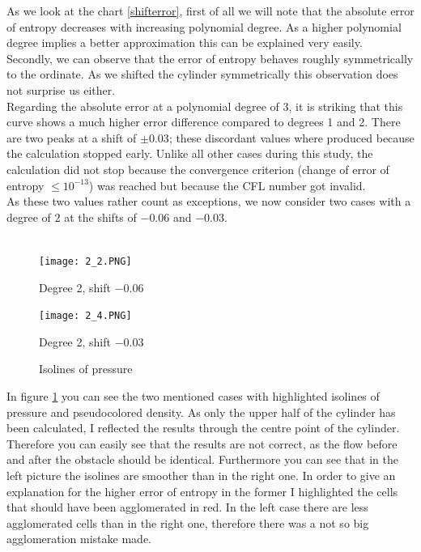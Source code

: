 	As we look at the chart \ref{shifterror}, first of all we will note that the absolute error of entropy decreases with increasing polynomial degree. As a higher polynomial degree implies a better approximation this can be explained very easily. \\ \indent
	Secondly, we can observe that the error of entropy behaves roughly symmetrically to the ordinate. As we shifted the cylinder symmetrically this observation does not surprise us either. \\ \indent
	Regarding the absolute error at a polynomial degree of 3, it is striking that this curve shows a much higher error difference compared to degrees 1 and 2. There are two peaks at a shift of $\pm 0.03$; these discordant values where produced because the calculation stopped early. Unlike all other cases during this study, the calculation did not stop because the convergence criterion (change of error of entropy $\leq 10^{-13}$) was reached but because the CFL number got invalid.\\ \indent
	As these two values rather count as exceptions, we now consider two cases with a degree of $2$ at the shifts of $-0.06$ and $-0.03$. \\\\
	
	\begin{figure}[htp]
		\centering
		\begin{minipage}[b]{0.5\textwidth}
			\centering
			\texttt{[image: 2\_2.PNG]}
			\caption*{Degree 2, shift $-0.06$}
			\label{fig:2_2}
		\end{minipage}%
		\begin{minipage}[b]{0.5\textwidth}
			\centering
			\texttt{[image: 2\_4.PNG]}
			\caption*{Degree 2, shift $-0.03$}
			\label{fig:2_4}
		\end{minipage}
		\caption{Isolines of pressure}\label{fig:isoshift}
	\end{figure}
	
	In figure \ref{fig:isoshift} you can see the two mentioned cases with highlighted isolines of pressure and pseudocolored density. As only the upper half of the cylinder has been calculated, I reflected the results through the centre point of the cylinder. Therefore you can easily see that the results are not correct, as the flow before and after the obstacle should be identical. Furthermore you can see that in the left picture the isolines are smoother than in the right one. In order to give an explanation for the higher error of entropy in the former I highlighted the cells that should have been agglomerated in red. In the left case there are less agglomerated cells than in the right one, therefore there was a not so big agglomeration mistake made.\\\\
	
